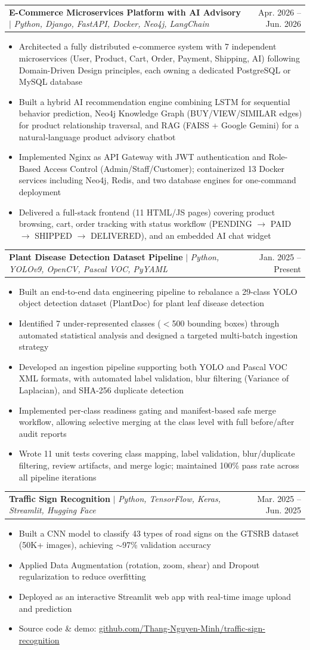 \documentclass[letterpaper,11pt]{article}
\makeatletter
\newcommand{\resumeItem}[1]{
  \item\small{{#1 \vspace{-2pt}}}
}
\newcommand{\resumeProjectHeading}[2]{
    \item
    \begin{tabular*}{0.97\textwidth}{l@{\extracolsep{\fill}}r}
      \small#1 & #2 \\
    \end{tabular*}\vspace{-7pt}
}
\newcommand{\resumeItemListStart}{\begin{itemize}}
\newcommand{\resumeItemListEnd}{\end{itemize}\vspace{-5pt}}
\makeatother
\begin{document}
      \resumeProjectHeading
          {\textbf{E-Commerce Microservices Platform with AI Advisory} $|$ \emph{Python, Django, FastAPI, Docker, Neo4j, LangChain}}{Apr. 2026 -- Jun. 2026}
          \resumeItemListStart
            \resumeItem{Architected a fully distributed e-commerce system with 7 independent microservices (User, Product, Cart, Order, Payment, Shipping, AI) following Domain-Driven Design principles, each owning a dedicated PostgreSQL or MySQL database}
            \resumeItem{Built a hybrid AI recommendation engine combining LSTM for sequential behavior prediction, Neo4j Knowledge Graph (BUY/VIEW/SIMILAR edges) for product relationship traversal, and RAG (FAISS + Google Gemini) for a natural-language product advisory chatbot}
            \resumeItem{Implemented Nginx as API Gateway with JWT authentication and Role-Based Access Control (Admin/Staff/Customer); containerized 13 Docker services including Neo4j, Redis, and two database engines for one-command deployment}
            \resumeItem{Delivered a full-stack frontend (11 HTML/JS pages) covering product browsing, cart, order tracking with status workflow (PENDING $\rightarrow$ PAID $\rightarrow$ SHIPPED $\rightarrow$ DELIVERED), and an embedded AI chat widget}
          \resumeItemListEnd

      \resumeProjectHeading
          {\textbf{Plant Disease Detection Dataset Pipeline} $|$ \emph{Python, YOLOv9, OpenCV, Pascal VOC, PyYAML}}{Jan. 2025 -- Present}
          \resumeItemListStart
            \resumeItem{Built an end-to-end data engineering pipeline to rebalance a 29-class YOLO object detection dataset (PlantDoc) for plant leaf disease detection}
            \resumeItem{Identified 7 under-represented classes ($<$500 bounding boxes) through automated statistical analysis and designed a targeted multi-batch ingestion strategy}
            \resumeItem{Developed an ingestion pipeline supporting both YOLO and Pascal VOC XML formats, with automated label validation, blur filtering (Variance of Laplacian), and SHA-256 duplicate detection}
            \resumeItem{Implemented per-class readiness gating and manifest-based safe merge workflow, allowing selective merging at the class level with full before/after audit reports}
            \resumeItem{Wrote 11 unit tests covering class mapping, label validation, blur/duplicate filtering, review artifacts, and merge logic; maintained 100\% pass rate across all pipeline iterations}
          \resumeItemListEnd

      \resumeProjectHeading
          {\textbf{Traffic Sign Recognition} $|$ \emph{Python, TensorFlow, Keras, Streamlit, Hugging Face}}{Mar. 2025 -- Jun. 2025}
          \resumeItemListStart
            \resumeItem{Built a CNN model to classify 43 types of road signs on the GTSRB dataset (50K+ images), achieving $\sim$97\% validation accuracy}
            \resumeItem{Applied Data Augmentation (rotation, zoom, shear) and Dropout regularization to reduce overfitting}
            \resumeItem{Deployed as an interactive Streamlit web app with real-time image upload and prediction}
            \resumeItem{Source code \& demo: \href{https://github.com/Thang-Nguyen-Minh/traffic-sign-recognition}{\underline{github.com/Thang-Nguyen-Minh/traffic-sign-recognition}}}
          \resumeItemListEnd
\end{document}
